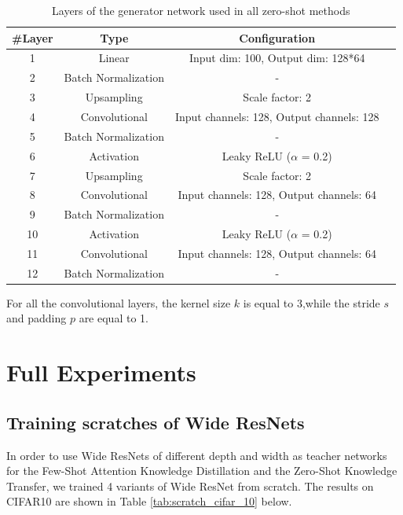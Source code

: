 \begin{table}[h!]
    \centering
    \begin{tabular}{|c|c|c|c|}
    \toprule
    \toprule
    \textbf{\#Layer} & \textbf{Type} & \textbf{Configuration}\\
    \midrule
    1 & Linear & Input dim: 100, Output dim: 128*64\\
    \midrule
    2 & Batch Normalization & - \\
    \midrule
    3 & Upsampling & Scale factor: 2 \\
    \midrule
    4 & Convolutional & Input channels: 128, Output channels: 128\\
    \midrule
    5 & Batch Normalization & - \\
    \midrule
    6 & Activation & Leaky ReLU ($\alpha$ = 0.2)\\
    \midrule
    7 & Upsampling & Scale factor: 2 \\
    \midrule
    8 & Convolutional & Input channels: 128, Output channels: 64\\
    \midrule
    9 & Batch Normalization & - \\
    \midrule
    10 & Activation & Leaky ReLU ($\alpha$ = 0.2)\\
    \midrule
    11 & Convolutional & Input channels: 128, Output channels: 64\\
    \midrule
    12 & Batch Normalization & - \\
    \bottomrule
    \bottomrule
    \end{tabular}
    \caption{Layers of the generator network used in all zero-shot methods}
    \label{generator_layers}
    \end{table}
    
    For all the convolutional layers, the kernel size $k$ is equal to 3,while the stride $s$ and padding $p$ are equal to 1. 

\newpage
\section{Full Experiments}
\subsection{Training scratches of Wide ResNets}

In order to use Wide ResNets of different depth and width as teacher networks for the Few-Shot Attention Knowledge Distillation and the Zero-Shot Knowledge Transfer, we trained 4 variants of Wide ResNet from scratch. The results on CIFAR10 are shown in Table \ref{tab:scratch_cifar_10} below. 

